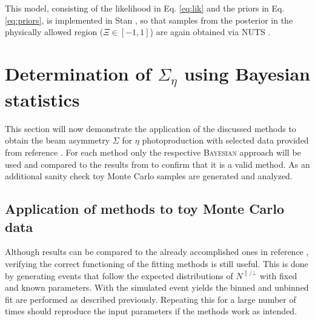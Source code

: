  This model, consisting of the likelihood in Eq. \eqref{eq:lik} and the priors in Eq. \eqref{eq:priors}, is implemented in Stan \cite{stan}, so that samples from the posterior in the physically allowed region ($\Xi\in[-1,1]$) are again obtained via NUTS \cite{nuts}.


\section{Determination of $\Sigma_{\eta}$ using Bayesian statistics}
This section will now demonstrate the application of the discussed methods to obtain the beam asymmetry $\Sigma$ for $\eta$ photoproduction with selected data provided from reference \cite{farahphd}. For each method only the respective \textsc{Bayesian} approach will be used and compared to the results from \cite{farahphd} to confirm that it is a valid method. As an additional sanity check toy Monte Carlo samples are generated and analyzed. 
\subsection{Application of methods to toy Monte Carlo data}
\label{subsec:toyMC}
Although results can be compared to the already accomplished ones in reference \cite{farahphd}, verifying the correct functioning of the fitting methods is still useful. This is done by generating events that follow the expected distributions of $N^{\parallel/\bot}$ with fixed and known parameters. With the simulated event yields the binned and unbinned fit are performed as described previously. Repeating this for a large number of times should reproduce the input parameters if the methods work as intended.
